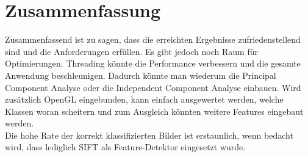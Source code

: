 \documentclass[liststotoc,11pt,a4paper]{article}
\begin{document}
 


\section{Zusammenfassung}
Zusammenfassend ist zu sagen, dass die erreichten Ergebnisse zufriedenstellend sind und die Anforderungen erfüllen. Es gibt jedoch noch Raum für Optimierungen. Threading könnte die Performance verbessern und die gesamte Anwendung beschleunigen. Dadurch könnte man wiederum die Principal Component Analyse oder die Independent Component Analyse einbauen. 
Wird zusätzlich OpenGL eingebunden, kann einfach ausgewertet werden, welche Klassen woran scheitern und zum Ausgleich könnten weitere Features eingebaut werden.
\\Die hohe Rate der korrekt klassifizierten Bilder ist erstaunlich, wenn bedacht wird, dass lediglich SIFT als Feature-Detektor eingesetzt wurde.
\end{document}
